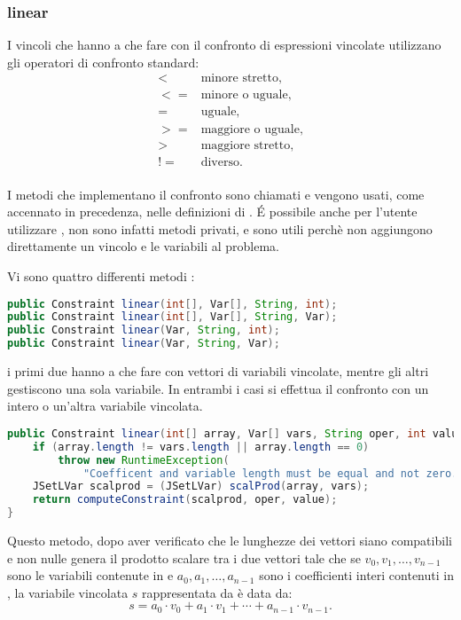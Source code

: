 \subsubsection{linear}
I vincoli che hanno a che fare con il confronto di espressioni vincolate
utilizzano gli operatori di confronto standard:
\[
\begin{array}{cl}
< & \textrm{minore stretto,} \\
<= & \textrm{minore o uguale,} \\
= & \textrm{uguale,} \\
>= & \textrm{maggiore o uguale,} \\
> & \textrm{maggiore stretto,} \\
!= & \textrm{diverso.} \\
\end{array}
\]

I metodi che implementano il confronto sono chiamati  e vengono
usati, come accennato in precedenza, nelle definizioni di . \'E
possibile anche per l'utente utilizzare , non sono infatti
metodi privati, e sono utili perchè non aggiungono direttamente un vincolo
e le variabili al problema.

Vi sono quattro differenti metodi :
\begin{lstlisting}[language = Java, frame = single]
public Constraint linear(int[], Var[], String, int);
public Constraint linear(int[], Var[], String, Var);
public Constraint linear(Var, String, int);
public Constraint linear(Var, String, Var);
\end{lstlisting}
i primi due hanno a che fare con vettori di variabili vincolate, mentre gli 
altri gestiscono una sola variabile. In entrambi i casi si effettua il confronto
con un intero o un'altra variabile vincolata.

\begin{lstlisting}[language = Java,
                   caption = {\files{linear}, con array di variabili.}]
public Constraint linear(int[] array, Var[] vars, String oper, int value) {
	if (array.length != vars.length || array.length == 0)
		throw new RuntimeException(
			"Coefficent and variable length must be equal and not zero.");
	JSetLVar scalprod = (JSetLVar) scalProd(array, vars);
	return computeConstraint(scalprod, oper, value);
}
\end{lstlisting}
Questo metodo, dopo aver verificato che le lunghezze dei vettori siano 
compatibili e non nulle genera il prodotto scalare tra i due vettori tale che
se $v_0, v_1, \ldots, v_{n-1}$ sono le variabili contenute in  e
$a_0, a_1, \ldots, a_{n-1}$ sono i coefficienti interi contenuti in 
,
la variabile vincolata $s$ rappresentata da  è data da:
\[
s = a_0\cdot v_0 + a_1\cdot v_1 + \cdots + a_{n-1}\cdot v_{n-1}.
\]


